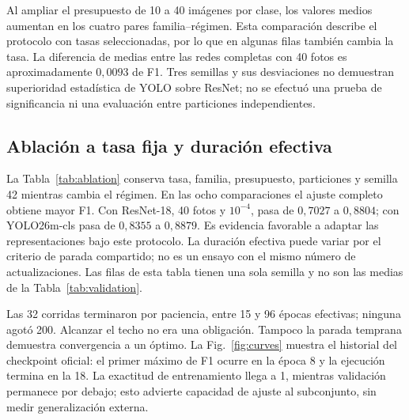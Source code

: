 \documentclass[conference]{IEEEtran}
\begin{document}
\begin{table}[t]\centering\footnotesize
\caption{F1 macro de validación con tasa seleccionada. Media $\pm$ desviación muestral, $n=3$. Capa: solo última capa lineal. $\eta$ se expresa en unidades de $10^{-4}$.}
\label{tab:validation}
\setlength{\tabcolsep}{3pt}

\end{table}

Al ampliar el presupuesto de 10 a 40 imágenes por clase, los valores medios aumentan en los cuatro pares familia--régimen. Esta comparación describe el protocolo con tasas seleccionadas, por lo que en algunas filas también cambia la tasa. La diferencia de medias entre las redes completas con 40 fotos es aproximadamente $0{,}0093$ de F1. Tres semillas y sus desviaciones no demuestran superioridad estadística de YOLO sobre ResNet; no se efectuó una prueba de significancia ni una evaluación entre particiones independientes.

\subsection{Ablación a tasa fija y duración efectiva}
La Tabla~\ref{tab:ablation} conserva tasa, familia, presupuesto, particiones y semilla 42 mientras cambia el régimen. En las ocho comparaciones el ajuste completo obtiene mayor F1. Con ResNet-18, 40 fotos y $10^{-4}$, pasa de $0{,}7027$ a $0{,}8804$; con YOLO26m-cls pasa de $0{,}8355$ a $0{,}8879$. Es evidencia favorable a adaptar las representaciones bajo este protocolo. La duración efectiva puede variar por el criterio de parada compartido; no es un ensayo con el mismo número de actualizaciones. Las filas de esta tabla tienen una sola semilla y no son las medias de la Tabla~\ref{tab:validation}.

\begin{table}[t]\centering\footnotesize
\caption{Ablación con tasa fija y semilla 42. F1 macro de validación; $\Delta=$ completa menos capa. $\eta$ en unidades de $10^{-4}$.}
\label{tab:ablation}\setlength{\tabcolsep}{3.5pt}

\end{table}

Las 32 corridas terminaron por paciencia, entre 15 y 96 épocas efectivas; ninguna agotó 200. Alcanzar el techo no era una obligación. Tampoco la parada temprana demuestra convergencia a un óptimo. La Fig.~\ref{fig:curves} muestra el historial del checkpoint oficial: el primer máximo de F1 ocurre en la época 8 y la ejecución termina en la 18. La exactitud de entrenamiento llega a 1, mientras validación permanece por debajo; esto advierte capacidad de ajuste al subconjunto, sin medir generalización externa.
\end{document}

